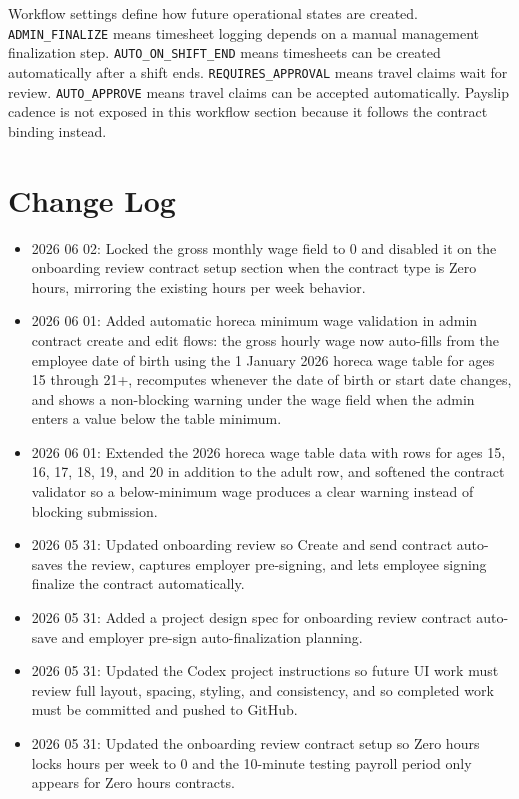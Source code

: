 \documentclass[11pt]{article}
\newcommand{\code}[1]{\nolinkurl{#1}}
\begin{document}
Workflow settings define how future operational states are created. \code{ADMIN_FINALIZE} means timesheet logging depends on a manual management finalization step. \code{AUTO_ON_SHIFT_END} means timesheets can be created automatically after a shift ends. \code{REQUIRES_APPROVAL} means travel claims wait for review. \code{AUTO_APPROVE} means travel claims can be accepted automatically. Payslip cadence is not exposed in this workflow section because it follows the contract binding instead.

\section*{Change Log}

\begin{itemize}
    \item 2026 06 02: Locked the gross monthly wage field to 0 and disabled it on the onboarding review contract setup section when the contract type is Zero hours, mirroring the existing hours per week behavior.
    \item 2026 06 01: Added automatic horeca minimum wage validation in admin contract create and edit flows: the gross hourly wage now auto-fills from the employee date of birth using the 1 January 2026 horeca wage table for ages 15 through 21+, recomputes whenever the date of birth or start date changes, and shows a non-blocking warning under the wage field when the admin enters a value below the table minimum.
    \item 2026 06 01: Extended the 2026 horeca wage table data with rows for ages 15, 16, 17, 18, 19, and 20 in addition to the adult row, and softened the contract validator so a below-minimum wage produces a clear warning instead of blocking submission.
    \item 2026 05 31: Updated onboarding review so Create and send contract auto-saves the review, captures employer pre-signing, and lets employee signing finalize the contract automatically.
    \item 2026 05 31: Added a project design spec for onboarding review contract auto-save and employer pre-sign auto-finalization planning.
    \item 2026 05 31: Updated the Codex project instructions so future UI work must review full layout, spacing, styling, and consistency, and so completed work must be committed and pushed to GitHub.
    \item 2026 05 31: Updated the onboarding review contract setup so Zero hours locks hours per week to 0 and the 10-minute testing payroll period only appears for Zero hours contracts.

\end{itemize}
\end{document}
